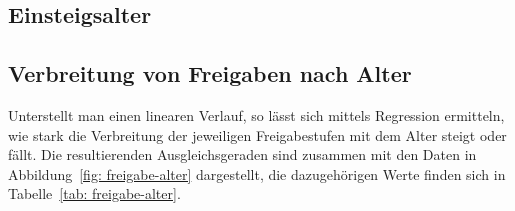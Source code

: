 \documentclass[11pt]{scrartcl}
\begin{document}
\subsection{Einsteigsalter}


\subsection{Verbreitung von Freigaben nach Alter}

Unterstellt man einen linearen Verlauf,
so lässt sich mittels Regression ermitteln,
wie stark die Verbreitung der jeweiligen Freigabestufen mit dem Alter
steigt oder fällt.
Die resultierenden Ausgleichsgeraden sind zusammen mit den Daten in
Abbildung~\ref{fig: freigabe-alter} dargestellt,
die dazugehörigen Werte finden sich in Tabelle~\ref{tab: freigabe-alter}.
\end{document}
